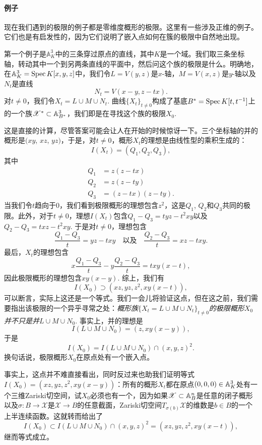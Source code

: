 \paragraph*{例子}
现在我们遇到的极限的例子都是零维度概形的极限。这里有一些涉及正维的例子。 它们也是有启发性的，因为它们说明了嵌入点如何在簇的极限中自然地出现。

第一个例子是$\mathbb{A}_K^3$中的三条穿过原点的直线，其中$K$是一个域。我们取三条坐标轴，转动其中一个到另两条直线的平面中，然后问这个族的极限是什么。明确地，在$\mathbb{A}_K^3=\operatorname{Spec} K[x,y,z]$中，我们令$L=V(y,z)$是$x$-轴，$M=V(x,z)$是$y$-轴以及$N_t$是直线
\[
	N_t=V(x-y,z-tx).
\]
对$t\neq 0$，我们令$X_t=L\cup M\cup N_t$. 曲线$\{X_t\}_{t\neq 0}$构成了基底$B^*=\operatorname{Spec} K[t,t^{-1}]$上的一个族$\mathscr{X}^*\subset \mathbb{A}_{B^*}^3$，我们即是在寻找这个族的极限$X_0$.

这是直接的计算，尽管答案可能会让人在开始的时候惊讶一下。三个坐标轴的并的概形是$(xy$, $xz$, $yz)$，于是，对$t\neq 0$，概形$X_t$的理想是由线性型的乘积生成的：
\[
	I(X_t)=(Q_1,Q_2,Q_3),
\]
其中
\[
	\begin{aligned}
		Q_1&=z(z-tx)\\
		Q_2&=z(z-ty)\\
		Q_3&=(z-tx)(z-ty).
	\end{aligned}
\]
当我们令$t$趋向于$0$，我们看到极限概形的理想包含$z^2$，这是$Q_1$, $Q_2$和$Q_3$共同的极限。此外，对于$t\neq 0$，理想$I(X_t)$包含$Q_1-Q_3=tyz-t^2xy$以及$Q_2-Q_3=txz-t^2xy$. 于是对$t\neq 0$，理想包含
\[
	\frac{Q_1-Q_3}{t}=yz-txy\quad\text{以及}\quad \frac{Q_2-Q_3}{t}=xz-txy.
\]
最后，$X_t$的理想包含
\[
	x\frac{Q_1-Q_3}{t}-y\frac{Q_2-Q_3}{t}=txy(x-t),
\]
因此极限概形的理想包含$xy(x-y)$. 综上，我们有
\[
	I(X_0)\supset (xz,yz,z^2,xy(x-t)),
\]
可以断言，实际上这还是一个等式。我们一会儿将验证这点，但在这之前，我们需要指出该极限的一个异乎寻常之处：\textit{概形族}$\{X_t=L\cup M\cup N_t\}_{t\neq 0}$\textit{的极限概形}$X_0$\textit{并不只是并}$L\cup M\cup N_0$. 事实上，并的理想是
\[
	I(L\cup M\cup N_0)=(z,xy(x-y)),
\]
于是
\[
	I(X_0)=I(L\cup M\cup N_0)\cap (x,y,z)^2.
\]
换句话说，极限概形$X_0$在原点处有一个嵌入点。

事实上，这点并不难直接看出，同时反过来也助我们证明等式$I(X_0)=(xz,yz,z^2,xy(x-y))$：所有的概形$X_t$都在原点$(0,0,0)\in\mathbb{A}_K^3$处有一个三维Zariski切空间，试$X_0$必须也有一个，因为如果$\mathscr{X}\subset \mathbb{A}_B^n$是任意的闭子概形以及$\sigma:B\to\mathscr{X}$是$\mathscr{X}\to B$的任意截面，Zariski切空间$T_{\sigma(b)}\mathscr{X}$的维数是$b\in B$的一个上半连续函数。这就转而给出了
\[
	I(X_0)\subset I(L\cup M\cup N_0)\cap (x,y,z)^2=(xz,yz,z^2,xy(x-t)),
\]
继而等式成立。

